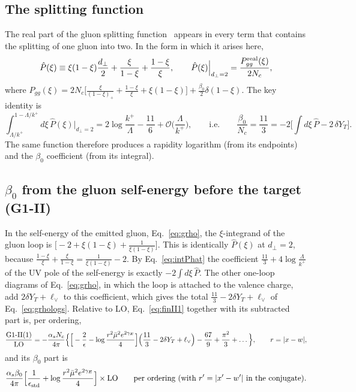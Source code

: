 \documentclass[aps,prd,onecolumn,superscriptaddress,nofootinbib,floatfix,longbibliography,11pt]{revtex4-2}
\numberwithin{equation}{section}
\newcommand{\lV}{\ell_{\vee}}
\newcommand{\Phat}{\hat P}
\newcommand{\Ord}{\mathcal{O}}
\begin{document}
\subsection{The splitting function}\label{sec:Phat}

The real part of the gluon splitting function~\cite{Gribov:1972ri,Altarelli:1977zs,Dokshitzer:1977sg} appears in every term that contains the splitting of one gluon into two. In the form in which it arises here,
\begin{equation}
\Phat(\xi)\equiv\xi(1-\xi)\frac{d_\perp}{2}+\frac{\xi}{1-\xi}+\frac{1-\xi}{\xi},\qquad \Phat(\xi)\Big|_{d_\perp=2}=\frac{P^{\rm real}_{gg}(\xi)}{2N_c},
\label{eq:Phat}
\end{equation}
where $P_{gg}(\xi)=2N_c\big[\frac{\xi}{(1-\xi)_+}+\frac{1-\xi}{\xi}+\xi(1-\xi)\big]+\frac{\beta_0}{2}\delta(1-\xi)$. The key identity is
\begin{equation}
\int_{\Lambda/k^+}^{1-\Lambda/k^+}d\xi\,\Phat(\xi)\Big|_{d_\perp=2}=2\log\frac{k^+}{\Lambda}-\frac{11}{6}+\Ord\Big(\frac{\Lambda}{k^+}\Big),\qquad\text{i.e.}\qquad \frac{\beta_0}{N_c}=\frac{11}{3}=-2\Big[\int d\xi\,\Phat-2\,\delta Y_T\Big].
\label{eq:intPhat}
\end{equation}
The same function therefore produces a rapidity logarithm (from its endpoints) and the $\beta_0$ coefficient (from its integral).

\subsection{\texorpdfstring{$\beta_0$}{beta0} from the gluon self-energy before the target (G1-II)}\label{sec:b0II}

In the self-energy of the emitted gluon, Eq.~\eqref{eq:grho}, the $\xi$-integrand of the gluon loop is $\big[-2+\xi(1-\xi)+\frac{1}{\xi(1-\xi)}\big]$. This is identically $\Phat(\xi)$ at $d_\perp=2$, because $\frac{1-\xi}{\xi}+\frac{\xi}{1-\xi}=\frac{1}{\xi(1-\xi)}-2$. By Eq.~\eqref{eq:intPhat} the coefficient $\frac{11}{3}+4\log\frac{\Lambda}{k^+}$ of the UV pole of the self-energy is exactly $-2\int d\xi\,\Phat$. The other one-loop diagrams of Eq.~\eqref{eq:grho}, in which the loop is attached to the valence charge, add $2\delta Y_T+\lV$ to this coefficient, which gives the total $\frac{11}{3}-2\delta Y_T+\lV$ of Eq.~\eqref{eq:grhologs}. Relative to LO, Eq.~\eqref{eq:finII1} together with its subtracted part is, per ordering,
\begin{equation}
\frac{\text{G1-II(1)}}{\rm LO}=-\frac{\alpha_sN_c}{4\pi}\Big\{\Big[-\frac2\epsilon-\log\frac{r^2\bar\mu^2e^{2\gamma_E}}{4}\Big]\Big(\frac{11}{3}-2\delta Y_T+\lV\Big)-\frac{67}{9}+\frac{\pi^2}{3}+\dots\Big\},\qquad r=|x-w|,
\end{equation}
and its $\beta_0$ part is
\begin{equation}
\frac{\alpha_s\beta_0}{4\pi}\Big[\frac{1}{\epsilon_{\rm std}}+\log\frac{r^2\bar\mu^2e^{2\gamma_E}}{4}\Big]\times{\rm LO}\qquad\text{per ordering (with $r'=|x'-w'|$ in the conjugate).}
\label{eq:b0II}
\end{equation}
\end{document}

